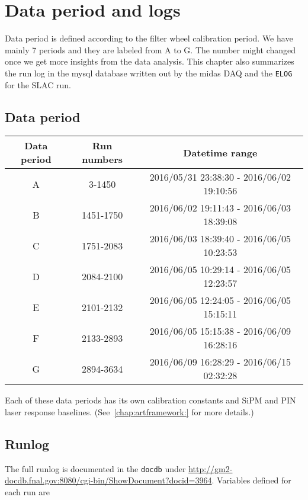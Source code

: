 \chapter{Data period and logs}
\label{chap:runlog}

Data period is defined according to the filter wheel calibration period. We have mainly 7 periods and they are labeled from A to G.  The number might changed once we get more insights from the data analysis. This chapter also summarizes the run log in the mysql database written out by the \ac{midas} DAQ and the \verb+ELOG+ for the SLAC run.

\section{Data period}

\begin{longtable}{|c|c|c|} \hline
Data period &  Run numbers & Datetime range \\ \hline
A & 3-1450 & 2016/05/31 23:38:30 - 2016/06/02 19:10:56 \\ \hline
B & 1451-1750 & 2016/06/02 19:11:43  - 2016/06/03 18:39:08 \\ \hline
C & 1751-2083 & 2016/06/03 18:39:40 - 2016/06/05 10:23:53 \\ \hline
D & 2084-2100 & 2016/06/05 10:29:14 - 2016/06/05 12:23:57 \\ \hline
E & 2101-2132 & 2016/06/05 12:24:05 - 2016/06/05 15:15:11 \\ \hline
F & 2133-2893 & 2016/06/05 15:15:38 - 2016/06/09 16:28:16 \\ \hline
G & 2894-3634 & 2016/06/09 16:28:29 - 2016/06/15 02:32:28 \\ \hline
\end{longtable}

Each of these data periods has its own calibration constants and SiPM and PIN laser response baselines.
(See~\cref{chap:artframework:} for more details.)

\section{Runlog}

The full runlog is documented in the \verb+docdb+ under \url{http://gm2-docdb.fnal.gov:8080/cgi-bin/ShowDocument?docid=3964}.
Variables defined for each run are

